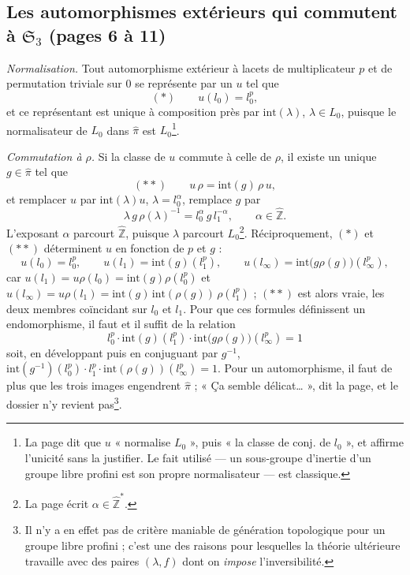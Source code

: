 \documentclass[11pt,a4paper]{article}
\begin{document}
\subsection*{Les automorphismes extérieurs qui commutent à $\mathfrak{S}_3$
(pages 6 à 11)}

\emph{Normalisation.} Tout automorphisme extérieur à lacets de multiplicateur
$p$ et de permutation triviale sur $0$ se représente par un $u$ tel que
\[
(*)\qquad u(l_0) = l_0^{p},
\]
et ce représentant est unique à composition près par $\mathrm{int}(\lambda)$,
$\lambda \in L_0$, puisque le normalisateur de $L_0$ dans $\widehat{\pi}$ est
$L_0$\footnote{La page dit que $u$ « normalise $L_0$ », puis « la classe de
conj. de $l_0$ », et affirme l'unicité sans la justifier. Le fait utilisé — un
sous-groupe d'inertie d'un groupe libre profini est son propre normalisateur —
est classique.}.

\emph{Commutation à $\rho$.} Si la classe de $u$ commute à celle de $\rho$, il
existe un unique $g \in \widehat{\pi}$ tel que
\[
(**)\qquad u\,\rho = \mathrm{int}(g)\,\rho\, u ,
\]
et remplacer $u$ par $\mathrm{int}(\lambda) u$, $\lambda = l_0^{\alpha}$,
remplace $g$ par
\[
\lambda\, g\, \rho(\lambda)^{-1} = l_0^{\alpha}\, g\, l_1^{-\alpha},
\qquad \alpha \in \widehat{\mathbb{Z}}.
\]
L'exposant $\alpha$ parcourt $\widehat{\mathbb{Z}}$, puisque $\lambda$
parcourt $L_0$\footnote{La page écrit $\alpha \in \widehat{\mathbb{Z}}^{*}$.}.
Réciproquement, $(*)$ et $(**)$ déterminent $u$ en fonction de $p$ et $g$ :
\[
u(l_0) = l_0^{p}, \qquad u(l_1) = \mathrm{int}(g)(l_1^{p}), \qquad u(l_\infty)
= \mathrm{int}\bigl(g\rho(g)\bigr)(l_\infty^{p}),
\]
car $u(l_1) = u\rho(l_0) = \mathrm{int}(g)\rho(l_0^{p})$ et $u(l_\infty) =
u\rho(l_1) = \mathrm{int}(g)\,\mathrm{int}(\rho(g))\,\rho(l_1^{p})$ ; $(**)$ est
alors vraie, les deux membres coïncidant sur $l_0$ et $l_1$. Pour que ces
formules définissent un endomorphisme, il faut et il suffit de la relation
\[
\boxed{\; l_0^{p} \cdot \mathrm{int}(g)(l_1^{p}) \cdot
\mathrm{int}\bigl(g\rho(g)\bigr)(l_\infty^{p}) = 1 \;}
\]
soit, en développant puis en conjuguant par $g^{-1}$,
$\mathrm{int}(g^{-1})(l_0^{p})\cdot l_1^{p} \cdot
\mathrm{int}(\rho(g))(l_\infty^{p}) = 1$. Pour un automorphisme, il faut de plus
que les trois images engendrent $\widehat{\pi}$ ; « Ça semble délicat… », dit
la page, et le dossier n'y revient pas\footnote{Il n'y a en effet pas de
critère maniable de génération topologique pour un groupe libre profini ;
c'est une des raisons pour lesquelles la théorie ultérieure travaille avec des
paires $(\lambda, f)$ dont on \emph{impose} l'inversibilité.}.
\end{document}
